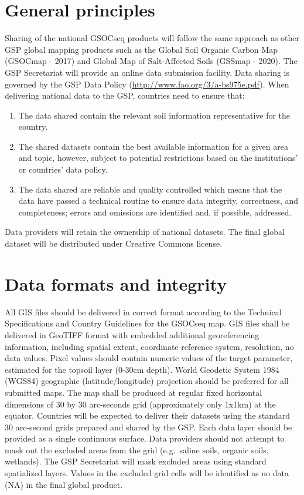 \documentclass[
  10pt,
  b5paper,
]{book}
\providecommand{\tightlist}{%
  \setlength{\itemsep}{0pt}\setlength{\parskip}{0pt}}
\begin{document}
\hypertarget{general-principles}{%
\section{General principles}\label{general-principles}}

Sharing of the national GSOCseq products will follow the same approach as other GSP global mapping products such as the Global Soil Organic Carbon Map (GSOCmap - 2017) and Global Map of Salt-Affected Soils (GSSmap - 2020). The GSP Secretariat will provide an online data submission facility.
Data sharing is governed by the GSP Data Policy (\url{http://www.fao.org/3/a-bs975e.pdf}). When delivering national data to the GSP, countries need to ensure that:

\begin{enumerate}
\def\labelenumi{\arabic{enumi}.}
\tightlist
\item
  The data shared contain the relevant soil information representative for the country.
\item
  The shared datasets contain the best available information for a given area and topic, however, subject to potential restrictions based on the institutions' or countries' data policy.
\item
  The data shared are reliable and quality controlled which means that the data have passed a technical routine to ensure data integrity, correctness, and completeness; errors and omissions are identified and, if possible, addressed.
\end{enumerate}

Data providers will retain the ownership of national datasets. The final global dataset will be distributed under Creative Commons license.

\hypertarget{data-formats-and-integrity}{%
\section{Data formats and integrity}\label{data-formats-and-integrity}}

All GIS files should be delivered in correct format according to the Technical Specifications and Country Guidelines for the GSOCseq map.
GIS files shall be delivered in GeoTIFF format with embedded additional georeferencing information, including spatial extent, coordinate reference system, resolution, no data values. Pixel values should contain numeric values of the target parameter, estimated for the topsoil layer (0-30cm depth).
World Geodetic System 1984 (WGS84) geographic (latitude/longitude) projection should be preferred for all submitted maps. The map shall be produced at regular fixed horizontal dimensions of 30 by 30 arc-seconds grid (approximately only 1x1km) at the equator. Countries will be expected to deliver their datasets using the standard 30 arc-second grids prepared and shared by the GSP.
Each data layer should be provided as a single continuous surface. Data providers should not attempt to mask out the excluded areas from the grid (e.g.~saline soils, organic soils, wetlands). The GSP Secretariat will mask excluded areas using standard spatialized layers. Values in the excluded grid cells will be identified as no data (NA) in the final global product.
\end{document}
